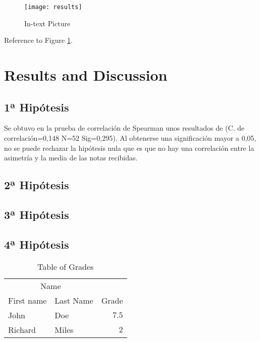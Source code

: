 \documentclass[fleqn,10pt]{SelfArx} %
\begin{document}
\begin{figure}[ht]\centering
	\texttt{[image: results]}
	\caption{In-text Picture}
	\label{fig:results}
\end{figure}

Reference to Figure \ref{fig:results}.


\section{Results and Discussion}

\subsection{1ª Hipótesis}

Se obtuvo en la prueba de correlación de Spearman unos resultados de (C. de correlación=0,148 N=52
Sig=0,295). Al obtenerse una significación mayor a 0,05, no se puede rechazar la hipótesis nula que es que no hay una correlación entre la asimetría y la media de las notas recibidas.

\subsection{2ª Hipótesis}


\subsection{3ª Hipótesis}



\subsection{4ª Hipótesis}



\begin{table}[hbt]
	\caption{Table of Grades}
	\centering
	\begin{tabular}{llr}
		\toprule
		\multicolumn{2}{c}{Name} \\
		\cmidrule(r){1-2}
		First name & Last Name & Grade \\
		\midrule
		John & Doe & $7.5$ \\
		Richard & Miles & $2$ \\
		\bottomrule
	\end{tabular}
	\label{tab:label}
\end{table}
\end{document}
